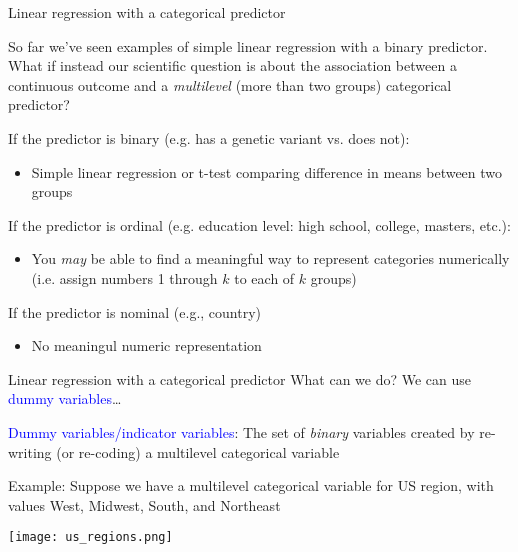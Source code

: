 \documentclass[10pt,t]{beamer}
\begin{document}
\begin{frame}{Linear regression with a categorical predictor}
	\vspace{-5 mm}
	
So far we've seen examples of simple linear regression with a binary predictor. What if instead our scientific question is about the association between a continuous outcome and a \textit{multilevel} (more than two groups) categorical predictor? \pause

\vspace{0.3cm}

If the predictor is binary (e.g. has a genetic variant vs. does not):
\begin{itemize}
	\item Simple linear regression or t-test comparing difference in means between two groups
\end{itemize} \pause

\vspace{0.3cm}

If the predictor is ordinal (e.g. education level: high school, college, masters, etc.):
\begin{itemize}
	\item You \textit{may} be able to find a meaningful way to represent categories numerically (i.e. assign numbers 1 through $k$ to each of $k$ groups)
\end{itemize} \pause

\vspace{0.3cm}

If the predictor is nominal (e.g., country)
\begin{itemize}
	\item No meaningul numeric representation
\end{itemize}

\end{frame}

\begin{frame}{Linear regression with a categorical predictor}
What can we do? \pause We can use \textcolor{blue}{dummy variables}\dots

\vspace{0.3cm}

\textcolor{blue}{Dummy variables/indicator variables}: The set of \textit{binary} variables created by re-writing (or re-coding) a multilevel categorical variable  \pause

\vspace{0.3cm}

Example: Suppose we have a multilevel categorical variable for US region, with values West, Midwest, South, and Northeast

\vspace{0.1cm}

\centering

\texttt{[image: us\_regions.png]}

\end{frame}
\end{document}
